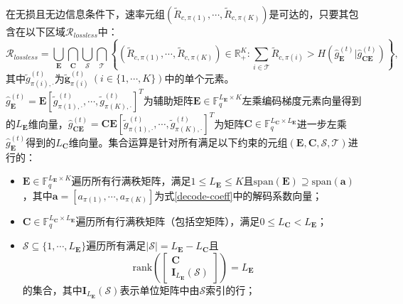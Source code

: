  \begin{corollary}\label{bcst}
	在无损且无边信息条件下，速率元组$(\tilde{R}_{c,\pi(1)},\cdots,\tilde{R}_{c,\pi(K)})$是可达的，只要其包含在以下区域$\mathcal{R}_{lossless}$中：
	\begin{equation}
		\mathcal{R}_{lossless}=\bigcup_{\mathbf{E}}\bigcap_{\mathbf{C}}\bigcup_{\mathcal{S}}\bigcap_{\mathcal{T}}\left\{(\tilde{R}_{c,\pi(1)},\cdots,\tilde{R}_{c,\pi(K)})\in\mathbb{R}_+^K: \sum_{i\in\mathcal{T}}\tilde{R}_{c,\pi(i)}> H(\hat{g}_{\mathbf{E}}^{(t)}|\hat{g}_{\mathbf{C}\mathbf{E}}^{(t)})\right\},\label{lossless_region}
		\end{equation}
		其中$\tilde{g}_{\pi(i),\cdot}^{(t)}$为$\tilde{\mathbf{g}}_{\pi(i)}^{(t)}~(i\in\{1,\cdots,K\})$中的单个元素。$\hat{g}_{\mathbf{E}}^{(t)}=\mathbf{E}[\tilde{g}_{\pi(1),\cdot}^{(t)},\cdots,\tilde{g}_{\pi(K),\cdot}^{(t)}]^T$为辅助矩阵$\mathbf{E}\in\mathbb{F}_q^{L_{\mathbf{E}}\times K}$左乘编码梯度元素向量得到的$L_{\mathbf{E}}$维向量，$\hat{g}_{\mathbf{C}\mathbf{E}}^{(t)}=\mathbf{C}\mathbf{E}[\tilde{g}_{\pi(1),\cdot}^{(t)},\cdots,\tilde{g}_{\pi(K),\cdot}^{(t)}]^T$为矩阵$\mathbf{C}\in\mathbb{F}_q^{L_{\mathbf{C}}\times L_{\mathbf{E}}}$进一步左乘$\hat{g}_{\mathbf{E}}^{(t)}$得到的$L_{\mathbf{C}}$维向量。集合运算是针对所有满足以下约束的元组$(\mathbf{E},\mathbf{C},\mathcal{S},\mathcal{T})$进行的：

	\begin{itemize}
		\item[(a)] $\mathbf{E}\in \mathbb{F}_q^{L_{\mathbf{E}}\times K}$遍历所有行满秩矩阵，满足$1\leq L_{\mathbf{E}}\leq
		K$且$\mathrm{span}(\mathbf{E})\supseteq\mathrm{span}(\mathbf{a})$，其中$\mathbf{a}=[a_{\pi(1)},\cdots,a_{\pi(K)}]$为式\eqref{decode-coeff}中的解码系数向量；

		\item[(b)] $\mathbf{C}\in \mathbb{F}_q^{L_{\mathbf{C}}\times L_{\mathbf{E}}}$遍历所有行满秩矩阵（包括空矩阵），满足$0\leq L_{\mathbf{C}}< L_{\mathbf{E}}$；

		\item[(c)] $\mathcal{S}\subseteq\{1,\cdots,L_{\mathbf{E}}\}$遍历所有满足$|\mathcal{S}|=L_{\mathbf{E}}-L_{\mathbf{C}}$且
		\begin{equation}
			\mathrm{rank}\left(\begin{bmatrix}
				\mathbf{C}\\
				\mathbf{I}_{L_{\mathbf{E}}}(\mathcal{S})
			\end{bmatrix}\right)=L_{\mathbf{E}}
		\end{equation}
		的集合，其中$\mathbf{I}_{L_{\mathbf{E}}}(\mathcal{S})$表示单位矩阵中由$\mathcal{S}$索引的行；


\end{itemize}
\end{corollary}
